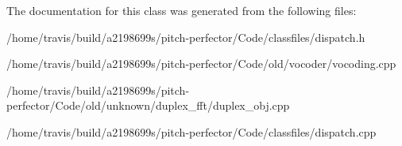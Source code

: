 The documentation for this class was generated from the following files\-:\begin{DoxyCompactItemize}
\item 
/home/travis/build/a2198699s/pitch-\/perfector/\-Code/classfiles/dispatch.\-h\item 
/home/travis/build/a2198699s/pitch-\/perfector/\-Code/old/vocoder/vocoding.\-cpp\item 
/home/travis/build/a2198699s/pitch-\/perfector/\-Code/old/unknown/duplex\-\_\-fft/duplex\-\_\-obj.\-cpp\item 
/home/travis/build/a2198699s/pitch-\/perfector/\-Code/classfiles/dispatch.\-cpp\end{DoxyCompactItemize}
